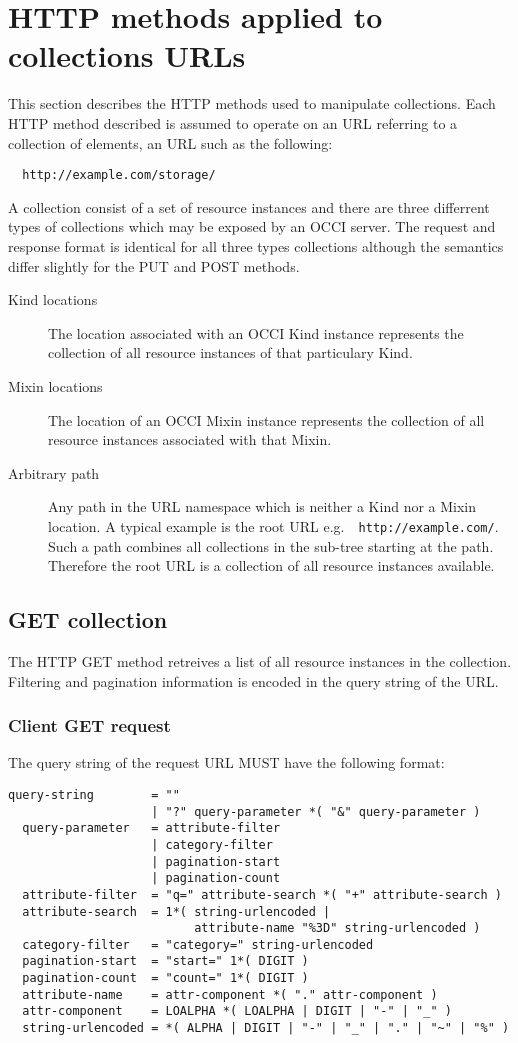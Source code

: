 \documentclass[10pt,a4paper]{article}
\begin{document}
\section{HTTP methods applied to collections URLs}
This section describes the HTTP methods used to manipulate collections. Each
HTTP method described is assumed to operate on an URL referring to a collection
of elements, an URL such as the following:
\begin{verbatim}
  http://example.com/storage/
\end{verbatim}

A collection consist of a set of resource instances and there are three
differrent types of collections which may be exposed by an OCCI server.  The
request and response format is identical for all three types collections
although the semantics differ slightly for the PUT and POST methods.
\begin{description}
\item[Kind locations] The location associated with an OCCI Kind instance
represents the collection of all resource instances of that particulary Kind.
\item[Mixin locations] The location of an OCCI Mixin instance represents the
collection of all resource instances associated with that Mixin.
\item[Arbitrary path] Any path in the URL namespace which is neither a Kind nor
a Mixin location. A typical example is the root URL e.g.~{\tt
http://example.com/}. Such a path combines all collections in the sub-tree
starting at the path. Therefore the root URL is a collection of all resource
instances available.
\end{description}

\subsection{GET collection}
The HTTP GET method retreives a list of all resource instances in the
collection. Filtering and pagination information is encoded in the query string
of the URL.

\subsubsection{Client GET request}
The query string of the request URL MUST have the following format:
\begin{verbatim}
query-string        = ""
                    | "?" query-parameter *( "&" query-parameter )
  query-parameter   = attribute-filter
                    | category-filter
                    | pagination-start
                    | pagination-count
  attribute-filter  = "q=" attribute-search *( "+" attribute-search )
  attribute-search  = 1*( string-urlencoded |
                          attribute-name "%3D" string-urlencoded )
  category-filter   = "category=" string-urlencoded
  pagination-start  = "start=" 1*( DIGIT )
  pagination-count  = "count=" 1*( DIGIT )
  attribute-name    = attr-component *( "." attr-component )
  attr-component    = LOALPHA *( LOALPHA | DIGIT | "-" | "_" )
  string-urlencoded = *( ALPHA | DIGIT | "-" | "_" | "." | "~" | "%" )

\end{verbatim}
\end{document}

